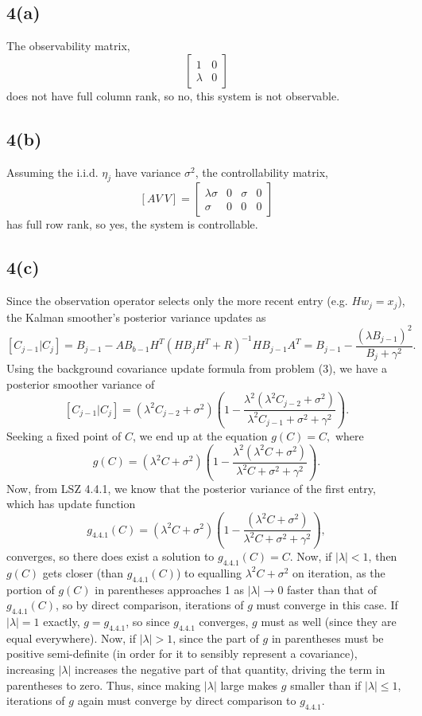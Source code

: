 \documentclass[11pt]{article}
\begin{document}
\subsection*{4(a)} The observability matrix,
\[
\begin{bmatrix}
1 & 0\\
\lambda & 0
\end{bmatrix}
\]
does not have full column rank, so no, this system is not observable.
\subsection*{4(b)} Assuming the i.i.d. $\eta_j$ have variance $\sigma^2$, the controllability matrix,
\[
[AV\ V] = \begin{bmatrix}
\lambda\sigma & 0 & \sigma & 0 \\
\sigma & 0 & 0 & 0
\end{bmatrix}
\]
has full row rank, so yes, the system is controllable.

\subsection*{4(c)} Since the observation operator selects only the more recent entry (e.g. $Hw_j = x_j$), the Kalman smoother's posterior variance updates as
\[
[C_{j-1} | C_j] = B_{j-1} - AB_{b-1} H^T(HB_jH^T + R)^{-1} HB_{j-1}A^T = B_{j-1} - \dfrac{(\lambda B_{j-1})^2}{B_j + \gamma^2}.
\]
Using the background covariance update formula from problem (3), we have a posterior smoother variance of
\[
[C_{j-1} | C_j] = (\lambda^2 C_{j-2} + \sigma^2)\left( 1 - \dfrac{\lambda^2 (\lambda^2 C_{j-2} + \sigma^2)}{\lambda^2 C_{j-1} + \sigma^2 + \gamma^2}\right).
\]
Seeking a fixed point of $C$, we end up at the equation $g(C) = C,$ where
\[
g(C) =  (\lambda^2 C + \sigma^2)\left( 1 - \dfrac{\lambda^2 (\lambda^2 C + \sigma^2)}{\lambda^2 C + \sigma^2 + \gamma^2}\right).
\]
Now, from LSZ 4.4.1, we know that the posterior variance of the first entry, which has update function 
\[
g_{4.4.1}(C) =  (\lambda^2 C + \sigma^2)\left( 1 - \dfrac{(\lambda^2 C + \sigma^2)}{\lambda^2 C + \sigma^2 + \gamma^2}\right),
\]
converges, so there does exist a solution to $g_{4.4.1}(C) = C$. Now, if $|\lambda | < 1$, then $g(C)$ gets closer (than $g_{4.4.1}(C)$) to equalling $\lambda^2 C + \sigma^2$ on iteration, as the portion of $g(C)$ in parentheses approaches 1 as $|\lambda |\to 0$ faster than that of $g_{4.4.1}(C)$, so by direct comparison, iterations of $g$ must converge in this case. If $|\lambda | = 1$ exactly, $g = g_{4.4.1}$, so since $g_{4.4.1}$ converges, $g$ must as well (since they are equal everywhere). Now, if $|\lambda | > 1$, since the part of $g$ in parentheses must be positive semi-definite (in order for it to sensibly represent a covariance), increasing $|\lambda |$ increases the negative part of that quantity, driving the term in parentheses to zero. Thus, since making $|\lambda |$ large makes $g$ smaller than if $|\lambda | \leq 1$, iterations of $g$ again must converge by direct comparison to $g_{4.4.1}$.
\end{document}
